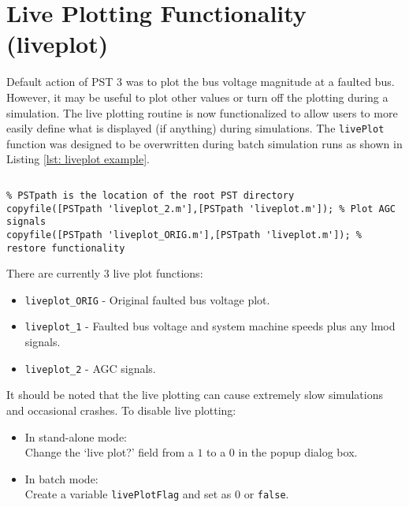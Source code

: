 \section{Live Plotting Functionality (liveplot)} 
Default action of PST 3 was to plot the bus voltage magnitude at a faulted bus.
However, it may be useful to plot other values or turn off the plotting during a simulation.
The live plotting routine is now functionalized to allow users to more easily define what is displayed (if anything) during simulations.
The \verb|livePlot| function was designed to be overwritten during batch simulation runs as shown in Listing \ref{lst: liveplot example}.

\begin{lstlisting}[caption={Live Plotting Overwrite Example},label={lst: liveplot example}]
\end{lstlisting}\vspace{-2 em}
\begin{verbatim}
% PSTpath is the location of the root PST directory
copyfile([PSTpath 'liveplot_2.m'],[PSTpath 'liveplot.m']); % Plot AGC signals 
copyfile([PSTpath 'liveplot_ORIG.m'],[PSTpath 'liveplot.m']); % restore functionality
\end{verbatim}

There are currently 3 live plot functions:

\begin{itemize}
\item \verb|liveplot_ORIG| - Original faulted bus voltage plot.
\item \verb|liveplot_1| - Faulted bus voltage and system machine speeds plus any lmod signals.
\item \verb|liveplot_2| - AGC signals.
\end{itemize}

It should be noted that the live plotting can cause extremely slow simulations and occasional crashes.
To disable live plotting:
\begin{itemize}
\item In stand-alone mode: \\Change the `live plot?' field from a $1$ to a $0$ in the popup dialog box.
\item In batch mode:  \\Create a variable \verb|livePlotFlag| and set as $0$ or \verb|false|.
\end{itemize}